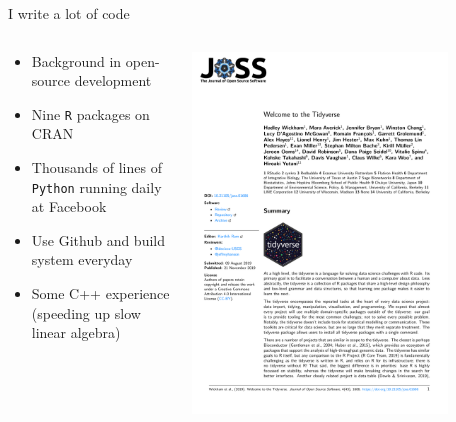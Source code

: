 \documentclass[aspectratio=169]{beamer}
\theoremstyle{remark}
\begin{document}
\begin{frame}{I write a lot of code}
    \vfill
    \begin{columns}
        \begin{column}{0.55\textwidth}
            \begin{itemize}
                \item Background in open-source development
                \item Nine \texttt{R} packages on CRAN
                \item Thousands of lines of \texttt{Python} running daily at Facebook
                \item Use Github and build system everyday
                \item Some C++ experience (speeding up slow linear algebra)
            \end{itemize}
        \end{column}
        \begin{column}{0.45\textwidth}
            \centering
            \includegraphics[width=0.8\textwidth, page=1]{tidyverse.pdf}
        \end{column}
    \end{columns}
\end{frame}
\end{document}
